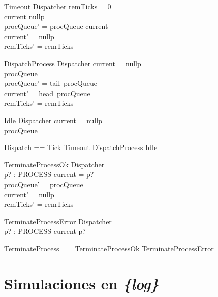 \documentclass{article}
\begin{document}
\begin{schema}{Timeout}
    \Delta Dispatcher
\where
    remTicks = 0 \\
    current \neq nullp \\
    procQueue' = procQueue \cat \langle current \rangle \\
    current' = nullp \\
    remTicks' = remTicks 
\end{schema}

\begin{schema}{DispatchProcess}
    \Delta Dispatcher
\where
    current = nullp \\
    procQueue \neq \langle \rangle \\
    procQueue' = tail~procQueue \\
    current' = head~procQueue \\
    remTicks' = remTicks 
\end{schema}

\begin{schema}{Idle}
    \Xi Dispatcher
\where
    current = nullp \\
    procQueue = \langle \rangle
\end{schema}

\begin{zed}
    Dispatch == Tick \lor Timeout \lor DispatchProcess \lor Idle
\end{zed}

\begin{schema}{TerminateProcessOk}
    \Delta Dispatcher \\
    p? : PROCESS
\where
    current = p? \\
    procQueue' = procQueue \\
    current' = nullp \\
    remTicks' = remTicks
\end{schema}

\begin{schema}{TerminateProcessError}
    \Xi Dispatcher \\
    p? : PROCESS
\where
    current \neq p?
\end{schema}

\begin{zed}
    TerminateProcess == TerminateProcessOk \lor TerminateProcessError
\end{zed}


\section{Simulaciones en \textit{\{log\}}}
\end{document}
